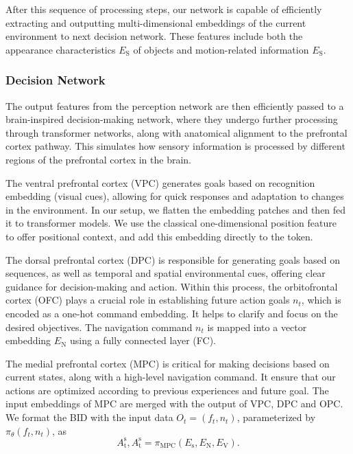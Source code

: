 %
After this sequence of processing steps, our network is capable of efficiently extracting and outputting multi-dimensional embeddings of the current environment to next decision network. 
These features include both the appearance characteristics $ E_\text{S} $ of objects and motion-related information $ E_\text{S} $.



\subsubsection{Decision Network}
The output features from the perception network are then efficiently passed to a brain-inspired decision-making network, where they undergo further processing through transformer networks, along with anatomical alignment to the prefrontal cortex pathway. 
This simulates how sensory information is processed by different regions of the prefrontal cortex in the brain.
%


The ventral prefrontal cortex (VPC) generates goals based on recognition embedding (visual cues), allowing for quick responses and adaptation to changes in the environment.
%
In our setup, we flatten the embedding patches and then fed it to transformer models.
We use the classical one-dimensional position feature~\cite{Alexey:2021} to offer positional context, and add this embedding directly to the token.


The dorsal prefrontal cortex (DPC) is responsible for generating goals based on sequences, as well as temporal and spatial environmental cues, offering clear guidance for decision-making and action.
Within this process, the orbitofrontal cortex (OFC) plays a crucial role in establishing future action goals $n_t$, which is encoded as a one-hot command embedding.
It helps to clarify and focus on the desired objectives. 
The navigation command $n_t$ is mapped into a vector embedding $E_\text{N}$ using a fully connected layer (FC).



The medial prefrontal cortex (MPC) is critical for making decisions based on current states, along with a high-level navigation command.
It ensure that our actions are optimized according to previous experiences and future goal.
The input embeddings of MPC are merged with the output of VPC, DPC and OPC.
We format the BID with the input data $O_t=(f_t, n_t)$, parameterized by $ \pi_{\theta}(f_t, n_t) $, as
\begin{equation}\label{eq:encoder}
	A_\text{t}^\text{s}, A_\text{t}^\text{s} = \pi_\text{MPC}(E_\text{s}, E_\text{N}, E_\text{V}).
\end{equation}


